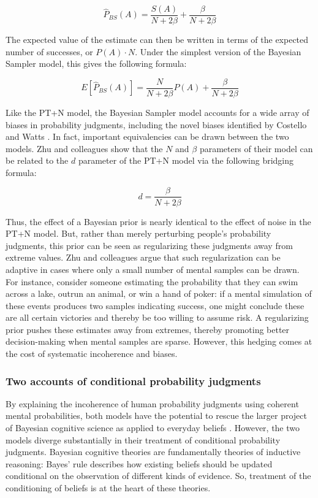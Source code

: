 \documentclass[
  english,
  man,floatsintext]{apa6}
\begin{document}
\[\hat{P}_{BS}(A) = \frac{S(A)}{N+2\beta} + \frac{\beta}{N+2\beta}\]

The expected value of the estimate can then be written in terms of the expected number of successes, or \(P(A) \cdot N\). Under the simplest version of the Bayesian Sampler model, this gives the following formula:

\[E[\hat{P}_{BS}(A)] = \frac{N}{N+2\beta}P(A) + \frac{\beta}{N+2\beta}\]

Like the PT+N model, the Bayesian Sampler model accounts for a wide array of biases in probability judgments, including the novel biases identified by Costello and Watts \autocite{costello.watts2014,costello.watts2016}. In fact, important equivalencies can be drawn between the two models. Zhu and colleagues \autocite*{zhu.etal2020} show that the \(N\) and \(\beta\) parameters of their model can be related to the \(d\) parameter of the PT+N model via the following bridging formula:

\[d = \frac{\beta}{N+2\beta}\]

Thus, the effect of a Bayesian prior is nearly identical to the effect of noise in the PT+N model. But, rather than merely perturbing people's probability judgments, this prior can be seen as regularizing these judgments away from extreme values. Zhu and colleagues \autocite*{zhu.etal2020} argue that such regularization can be adaptive in cases where only a small number of mental samples can be drawn. For instance, consider someone estimating the probability that they can swim across a lake, outrun an animal, or win a hand of poker: if a mental simulation of these events produces two samples indicating success, one might conclude these are all certain victories and thereby be too willing to assume risk. A regularizing prior pushes these estimates away from extremes, thereby promoting better decision-making when mental samples are sparse. However, this hedging comes at the cost of systematic incoherence and biases.

\hypertarget{two-accounts-of-conditional-probability-judgments}{%
\subsubsection{Two accounts of conditional probability judgments}\label{two-accounts-of-conditional-probability-judgments}}

By explaining the incoherence of human probability judgments using coherent mental probabilities, both models have the potential to rescue the larger project of Bayesian cognitive science as applied to everyday beliefs \autocite{chater.etal2020}. However, the two models diverge substantially in their treatment of conditional probability judgments. Bayesian cognitive theories are fundamentally theories of inductive reasoning: Bayes' rule describes how existing beliefs should be updated conditional on the observation of different kinds of evidence. So, treatment of the conditioning of beliefs is at the heart of these theories.
\end{document}
